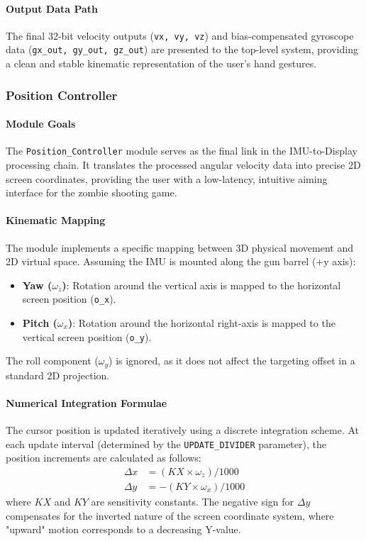 \documentclass[12pt,a4paper]{article}
\begin{document}
\paragraph{Output Data Path}
The final 32-bit velocity outputs (\texttt{vx, vy, vz}) and bias-compensated gyroscope data (\texttt{gx\_out, gy\_out, gz\_out}) are presented to the top-level system, providing a clean and stable kinematic representation of the user's hand gestures.

\subsubsection{Position Controller}

\paragraph{Module Goals}
The \texttt{Position\_Controller} module serves as the final link in the IMU-to-Display processing chain. It translates the processed angular velocity data into precise 2D screen coordinates, providing the user with a low-latency, intuitive aiming interface for the zombie shooting game.

\paragraph{Kinematic Mapping}
The module implements a specific mapping between 3D physical movement and 2D virtual space. Assuming the IMU is mounted along the gun barrel (+y axis):
\begin{itemize}
    \item \textbf{Yaw ($\omega_z$)}: Rotation around the vertical axis is mapped to the horizontal screen position (\texttt{o\_x}).
    \item \textbf{Pitch ($\omega_x$)}: Rotation around the horizontal right-axis is mapped to the vertical screen position (\texttt{o\_y}).
\end{itemize}
The roll component ($\omega_y$) is ignored, as it does not affect the targeting offset in a standard 2D projection.

\paragraph{Numerical Integration Formulae}
The cursor position is updated iteratively using a discrete integration scheme. At each update interval (determined by the \texttt{UPDATE\_DIVIDER} parameter), the position increments are calculated as follows:
\begin{align*}
    \Delta x &= (KX \times \omega_z) / 1000 \\
    \Delta y &= -(KY \times \omega_x) / 1000
\end{align*}
where $KX$ and $KY$ are sensitivity constants. The negative sign for $\Delta y$ compensates for the inverted nature of the screen coordinate system, where "upward" motion corresponds to a decreasing Y-value.
\end{document}

